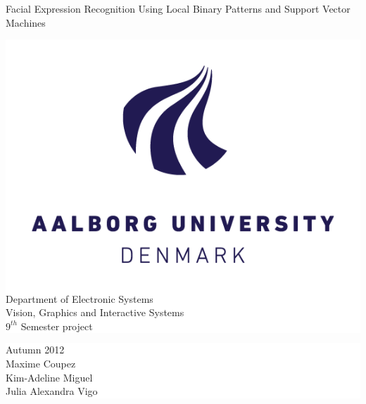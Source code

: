%
%
%
%
\begin{titlepage}

	\vspace*{\fill}
	{\selectfont
	
	\noindent \colorbox{aaublue}{
		\parbox{\textwidth}{%
			\color{white}%
			\begin{center}
				\Huge{Facial Expression Recognition Using Local Binary Patterns and Support Vector Machines} 
			\end{center}
		}}

	\vfill

	\noindent \colorbox{white}{
		\begin{minipage}[b]{6.5cm}
			\includegraphics{figures/aau_new_logo} \\
			{\small Department of Electronic Systems} \\
			{\small Vision, Graphics and Interactive Systems}  \\
			{\small $9^{th}$ Semester project}
		\end{minipage}
	} 
	\hfill  
	\colorbox{white}{ 
		\begin{minipage}[b]{3.5cm}	 
			\flushright
			{\large Autumn 2012} \\
			{\small Maxime Coupez}\\
			{\small Kim-Adeline Miguel}\\
			{\small Julia Alexandra Vigo}
		\end{minipage}
	}
	}
\end{titlepage}
\clearpage

